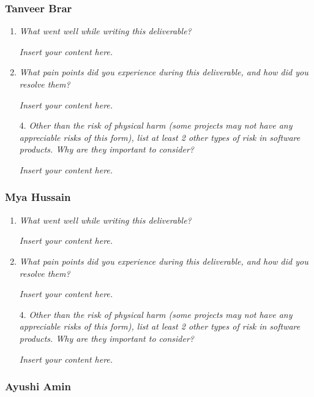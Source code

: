 \documentclass{article}
\newcommand{\lips}{\textit{Insert your content here.}}
\begin{document}
\subsubsection*{Tanveer Brar}

\begin{enumerate}
  \item \textit{What went well while writing this deliverable?}
  
  \lips

  \item \textit{What pain points did you experience during this deliverable, and how did you resolve them?}
  
  \lips
  
  \item[4.] \textit{Other than the risk of physical harm (some projects may not have any appreciable risks of this form),
  list at least 2 other types of risk in software products. Why are they important to consider?}

  \lips

\end{enumerate}

\subsubsection*{Mya Hussain}

\begin{enumerate}
  \item \textit{What went well while writing this deliverable?}
  
  \lips

  \item \textit{What pain points did you experience during this deliverable, and how did you resolve them?}
  
  \lips
  
  \item[4.] \textit{Other than the risk of physical harm (some projects may not have any appreciable risks of this form),
  list at least 2 other types of risk in software products. Why are they important to consider?}

  \lips

\end{enumerate}

\subsubsection*{Ayushi Amin}
\end{document}
